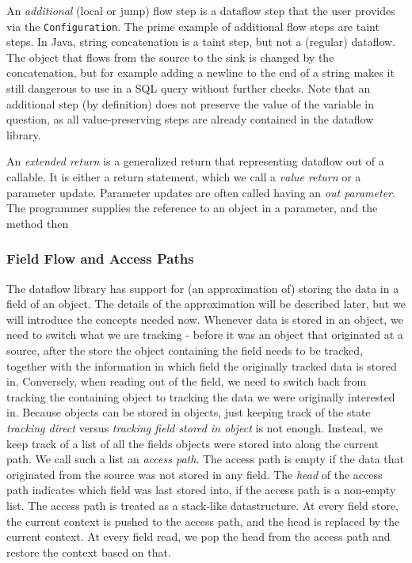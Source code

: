 An \emph{additional} (local or jump) flow step is a dataflow step that the user 
provides via the \texttt{Configuration}.
The prime example of additional flow steps are taint steps.
In Java, string concatenation is a taint step, but not a (regular) dataflow.
The object that flows from the source to the sink is changed by the concatenation,
but for example adding a newline to the end of a string makes it still dangerous
to use in a SQL query without further checks.
Note that an additional step (by definition) does not preserve the value of the
variable in question, as all value-preserving steps are already contained in the
dataflow library.


An \emph{extended return} is a generalized return that representing dataflow out of a callable.
It is either a return statement, which we call a \emph{value return} or a parameter update.
Parameter updates are often called having an \emph{out parameter}.
The programmer supplies the reference to an object in a parameter, and the method then

\subsubsection*{Field Flow and Access Paths}
The dataflow library has support for (an approximation of) storing the data in a
field of an object. The details of the approximation will be described later, but
we will introduce the concepts needed now.
Whenever data is stored in an object, we need to switch what we are tracking - 
before it was an object that originated at a source, after the store the object
containing the field needs to be tracked, together with the information in which
field the originally tracked data is stored in.
Conversely, when reading out of the field, we need to switch back from tracking
the containing object to tracking the data we were originally interested in.
Because objects can be stored in objects, just keeping track of the state 
\emph{tracking direct} versus \emph{tracking field stored in object} is not enough.
Instead, we keep track of a list of all the fields objects were stored into along 
the current path.
We call such a list an \emph{access path}.
The access path is empty if the data that originated from the source was not 
stored in any field.
The \emph{head} of the access path indicates which field was last stored into,
if the access path is a non-empty list.
The access path is treated as a stack-like datastructure.
At every field store, the current context is pushed to the access path, and the head is
replaced by the current context.
At every field read, we pop the head from the access path and restore the context based 
on that.


